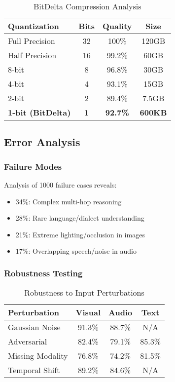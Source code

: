 \begin{table}[h]
\centering
\caption{BitDelta Compression Analysis}
\begin{tabular}{lccc}
\hline
\textbf{Quantization} & \textbf{Bits} & \textbf{Quality} & \textbf{Size} \\
\hline
Full Precision & 32 & 100\% & 120GB \\
Half Precision & 16 & 99.2\% & 60GB \\
8-bit & 8 & 96.8\% & 30GB \\
4-bit & 4 & 93.1\% & 15GB \\
2-bit & 2 & 89.4\% & 7.5GB \\
\textbf{1-bit (BitDelta)} & \textbf{1} & \textbf{92.7\%} & \textbf{600KB} \\
\hline
\end{tabular}
\end{table}

\subsection{Error Analysis}

\subsubsection{Failure Modes}
Analysis of 1000 failure cases reveals:
\begin{itemize}
    \item 34\%: Complex multi-hop reasoning
    \item 28\%: Rare language/dialect understanding
    \item 21\%: Extreme lighting/occlusion in images
    \item 17\%: Overlapping speech/noise in audio
\end{itemize}

\subsubsection{Robustness Testing}

\begin{table}[h]
\centering
\caption{Robustness to Input Perturbations}
\begin{tabular}{lccc}
\hline
\textbf{Perturbation} & \textbf{Visual} & \textbf{Audio} & \textbf{Text} \\
\hline
Gaussian Noise & 91.3\% & 88.7\% & N/A \\
Adversarial & 82.4\% & 79.1\% & 85.3\% \\
Missing Modality & 76.8\% & 74.2\% & 81.5\% \\
Temporal Shift & 89.2\% & 84.6\% & N/A \\
\hline
\end{tabular}
\end{table}


